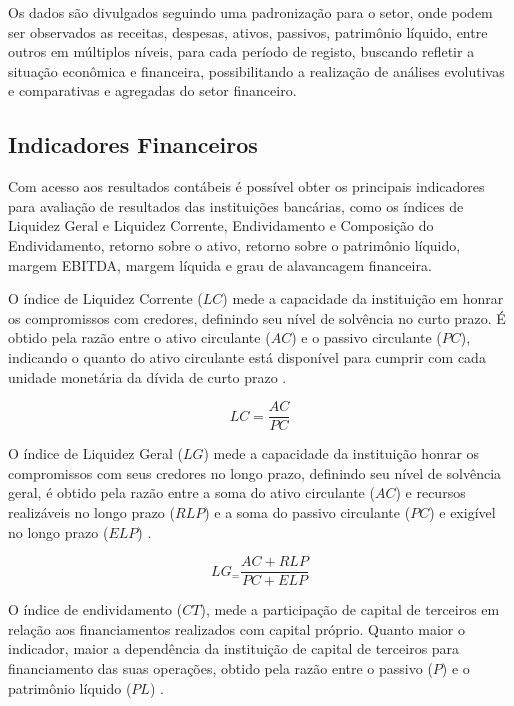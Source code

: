 \documentclass[
  12pt,
  12pt,
  openright,
  oneside,
  a4paper,
  chapter=TITLE,
  section=TITLE,
  subsection=TITLE,
  subsubsection=TITLE,
  english,
  portugues,
  sumario=tradicional]{abntex2}
\begin{document}
Os dados são divulgados seguindo uma padronização para o setor, onde podem ser observados as receitas, despesas, ativos, passivos, patrimônio líquido, entre outros em múltiplos níveis, para cada período de registo, buscando refletir a situação econômica e financeira, possibilitando a realização de análises evolutivas e comparativas e agregadas do setor financeiro.

\subsection{Indicadores Financeiros}

Com acesso aos resultados contábeis é possível obter os principais indicadores para avaliação de resultados das instituições bancárias, como os índices de Liquidez Geral e Liquidez Corrente, Endividamento e Composição do Endividamento, retorno sobre o ativo, retorno sobre o patrimônio líquido, margem EBITDA, margem líquida e grau de alavancagem financeira.

O índice de Liquidez Corrente (\(LC\)) mede a capacidade da instituição em honrar os compromissos com credores, definindo seu nível de solvência no curto prazo. É obtido pela razão entre o ativo circulante (\(AC\)) e o passivo circulante (\(PC\)), indicando o quanto do ativo circulante está disponível para cumprir com cada unidade monetária da dívida de curto prazo \cite{graham:2012} \cite{assaf:2020}.

\begin{equation}
LC = \frac{AC}{PC}
\end{equation}

O índice de Liquidez Geral (\(LG\)) mede a capacidade da instituição honrar os compromissos com seus credores no longo prazo, definindo seu nível de solvência geral, é obtido pela razão entre a soma do ativo circulante (\(AC\)) e recursos realizáveis no longo prazo (\(RLP\)) e a soma do passivo circulante (\(PC\)) e exigível no longo prazo (\(ELP\)) \cite{assaf:2020}.

\begin{equation}
LG_ = \frac{AC + RLP}{PC + ELP}
\end{equation}

O índice de endividamento (\(CT\)), mede a participação de capital de terceiros em relação aos financiamentos realizados com capital próprio. Quanto maior o indicador, maior a dependência da instituição de capital de terceiros para financiamento das suas operações, obtido pela razão entre o passivo (\(P\)) e o patrimônio líquido (\(PL\)) \cite{assaf:2020}.
\end{document}
